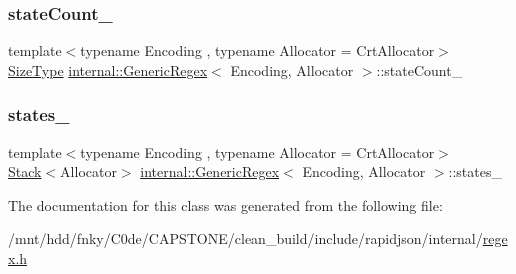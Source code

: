 \mbox{\label{classinternal_1_1GenericRegex_af47146f067e491bb9cb23b13a88a26db}} 
\subsubsection{\texorpdfstring{state\+Count\+\_\+}{stateCount\_}}
{\footnotesize\ttfamily template$<$typename Encoding , typename Allocator  = Crt\+Allocator$>$ \\
\hyperlink{rapidjson_8h_a5ed6e6e67250fadbd041127e6386dcb5}{Size\+Type} \hyperlink{classinternal_1_1GenericRegex}{internal\+::\+Generic\+Regex}$<$ Encoding, Allocator $>$\+::state\+Count\+\_\+\hspace{0.3cm}{\ttfamily [private]}}

\mbox{\label{classinternal_1_1GenericRegex_a5391b182b60bb8967dd0a6d99db9c9f0}} 
\subsubsection{\texorpdfstring{states\+\_\+}{states\_}}
{\footnotesize\ttfamily template$<$typename Encoding , typename Allocator  = Crt\+Allocator$>$ \\
\hyperlink{classinternal_1_1Stack}{Stack}$<$Allocator$>$ \hyperlink{classinternal_1_1GenericRegex}{internal\+::\+Generic\+Regex}$<$ Encoding, Allocator $>$\+::states\+\_\+\hspace{0.3cm}{\ttfamily [private]}}



The documentation for this class was generated from the following file\+:\begin{DoxyCompactItemize}
\item 
/mnt/hdd/fnky/\+C0de/\+C\+A\+P\+S\+T\+O\+N\+E/clean\+\_\+build/include/rapidjson/internal/\hyperlink{regex_8h}{regex.\+h}\end{DoxyCompactItemize}

